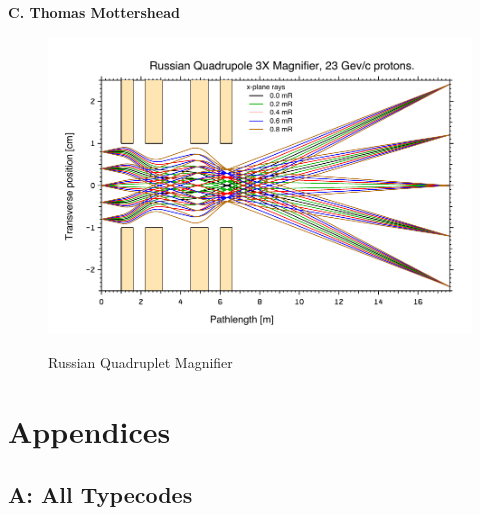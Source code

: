 \documentclass[11pt]{article} %
\newcommand{\sub}{\subsection}
\begin{document}
\begin{center}  {\bf C. Thomas Mottershead }
\begin{figure}[ht!] 
{\includegraphics[width=6.0in]{RQMag.pdf}}
\caption{ Russian Quadruplet Magnifier }
\end{figure}

\newpage
\section{Appendices}
\sub {A: All Typecodes}


\end{center}
\end{document}
